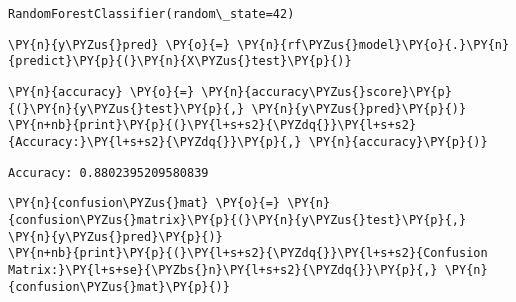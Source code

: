             \begin{tcolorbox}[breakable, size=fbox, boxrule=.5pt, pad at break*=1mm, opacityfill=0]
\begin{Verbatim}[commandchars=\\\{\}]
RandomForestClassifier(random\_state=42)
\end{Verbatim}
\end{tcolorbox}
        
    \begin{tcolorbox}[breakable, size=fbox, boxrule=1pt, pad at break*=1mm,colback=cellbackground, colframe=cellborder]
\begin{Verbatim}[commandchars=\\\{\}]
\PY{n}{y\PYZus{}pred} \PY{o}{=} \PY{n}{rf\PYZus{}model}\PY{o}{.}\PY{n}{predict}\PY{p}{(}\PY{n}{X\PYZus{}test}\PY{p}{)}
\end{Verbatim}
\end{tcolorbox}

    \begin{tcolorbox}[breakable, size=fbox, boxrule=1pt, pad at break*=1mm,colback=cellbackground, colframe=cellborder]
\begin{Verbatim}[commandchars=\\\{\}]
\PY{n}{accuracy} \PY{o}{=} \PY{n}{accuracy\PYZus{}score}\PY{p}{(}\PY{n}{y\PYZus{}test}\PY{p}{,} \PY{n}{y\PYZus{}pred}\PY{p}{)}
\PY{n+nb}{print}\PY{p}{(}\PY{l+s+s2}{\PYZdq{}}\PY{l+s+s2}{Accuracy:}\PY{l+s+s2}{\PYZdq{}}\PY{p}{,} \PY{n}{accuracy}\PY{p}{)}
\end{Verbatim}
\end{tcolorbox}

    \begin{Verbatim}[commandchars=\\\{\}]
Accuracy: 0.8802395209580839
    \end{Verbatim}

    \begin{tcolorbox}[breakable, size=fbox, boxrule=1pt, pad at break*=1mm,colback=cellbackground, colframe=cellborder]
\begin{Verbatim}[commandchars=\\\{\}]
\PY{n}{confusion\PYZus{}mat} \PY{o}{=} \PY{n}{confusion\PYZus{}matrix}\PY{p}{(}\PY{n}{y\PYZus{}test}\PY{p}{,} \PY{n}{y\PYZus{}pred}\PY{p}{)}
\PY{n+nb}{print}\PY{p}{(}\PY{l+s+s2}{\PYZdq{}}\PY{l+s+s2}{Confusion Matrix:}\PY{l+s+se}{\PYZbs{}n}\PY{l+s+s2}{\PYZdq{}}\PY{p}{,} \PY{n}{confusion\PYZus{}mat}\PY{p}{)}
\end{Verbatim}
\end{tcolorbox}

